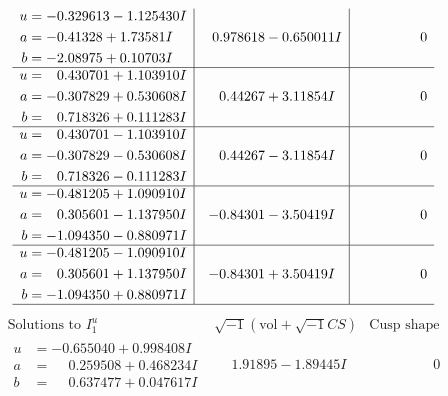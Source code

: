 \documentclass[1p]{elsarticle_modified}
\theoremstyle{definition}
\newcommand{\I}{\sqrt{-1}}
\begin{document}
$$\begin{array}{c|c|c}
\begin{aligned}
u &= -0.329613 - 1.125430 I \\
a &= -0.41328 + 1.73581 I \\
b &= -2.08975 + 0.10703 I\end{aligned}
 & \phantom{-}0.978618 - 0.650011 I & \phantom{-0.000000 } 0 \\ \hline\begin{aligned}
u &= \phantom{-}0.430701 + 1.103910 I \\
a &= -0.307829 + 0.530608 I \\
b &= \phantom{-}0.718326 + 0.111283 I\end{aligned}
 & \phantom{-}0.44267 + 3.11854 I & \phantom{-0.000000 } 0 \\ \hline\begin{aligned}
u &= \phantom{-}0.430701 - 1.103910 I \\
a &= -0.307829 - 0.530608 I \\
b &= \phantom{-}0.718326 - 0.111283 I\end{aligned}
 & \phantom{-}0.44267 - 3.11854 I & \phantom{-0.000000 } 0 \\ \hline\begin{aligned}
u &= -0.481205 + 1.090910 I \\
a &= \phantom{-}0.305601 - 1.137950 I \\
b &= -1.094350 - 0.880971 I\end{aligned}
 & -0.84301 - 3.50419 I & \phantom{-0.000000 } 0 \\ \hline\begin{aligned}
u &= -0.481205 - 1.090910 I \\
a &= \phantom{-}0.305601 + 1.137950 I \\
b &= -1.094350 + 0.880971 I\end{aligned}
 & -0.84301 + 3.50419 I & \phantom{-0.000000 } 0\\
 \hline 
 \end{array}$$\newpage$$\begin{array}{c|c|c}  
\text{Solutions to }I^u_{1}& \I (\text{vol} + \sqrt{-1}CS) & \text{Cusp shape}\\
 \hline 
\begin{aligned}
u &= -0.655040 + 0.998408 I \\
a &= \phantom{-}0.259508 + 0.468234 I \\
b &= \phantom{-}0.637477 + 0.047617 I\end{aligned}
 & \phantom{-}1.91895 - 1.89445 I & \phantom{-0.000000 } 0 \\ \hline\begin{aligned}

\end{aligned}
\end{array}$$
\end{document}
